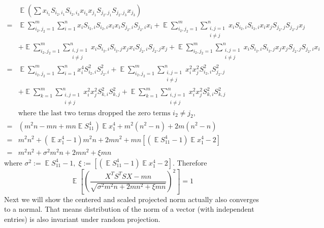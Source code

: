 \documentclass[12pt]{extarticle}
\newcommand{\1}{\field{1}}
\DeclareMathOperator{\E}{\mathbb{E}}
\numberwithin{equation}{section}
\begin{document}
\begin{align*}
& \E \left( \sum x_{i_1} S_{i_2,i_1} S_{i_2,i_3} x_{i_3} x_{j_1} S_{j_2,j_1} S_{j_2,j_3} x_{j_3} \right)  \\
= & \E \sum_{i_2, j_2=1}^m \sum_{i=1}^n x_i S_{i_2,i} S_{i_2,i} x_{i} x_{i} S_{j_2,i} S_{j_2,i} x_{i}  
+  \E  \sum_{i_2, j_2=1}^m \sum_{\substack{i,j=1\\ i\ne j}}^n x_{i} S_{i_2,i} S_{i_2,i} x_{i} x_{j} S_{j_2,j} S_{j_2,j} x_{j}   \\
& + \E  \sum_{i_2, j_2=1}^m \sum_{\substack{i,j=1\\ i\ne j}}^n x_{i} S_{i_2,i} S_{i_2,j} x_{j} x_{i} S_{j_2,i} S_{j_2,j} x_{j}  
 + \E  \sum_{i_2, j_2=1}^m \sum_{\substack{i,j=1\\ i\ne j}}^n x_{i} S_{i_2,i} S_{i_2,j} x_{j} x_{j} S_{j_2,j} S_{j_2,i} x_{i} \\
= & \E \sum_{i_2, j_2=1}^m \sum_{i=1}^n x_i^4 S_{i_2,i}^2  S_{j_2,i}^2   
+ \E  \sum_{i_2, j_2=1}^m \sum_{\substack{i,j=1\\ i\ne j}}^n x_{i}^2 x_{j}^2 S_{i_2,i}^2 S_{j_2,j}^2 \\
& + \E  \sum_{k=1}^m \sum_{\substack{i,j=1\\ i\ne j}}^n x_{i}^2 x_{j}^2 S_{k,i}^2 S_{k,j}^2   
+ \E  \sum_{k=1}^m \sum_{\substack{i,j=1\\ i\ne j}}^n x_{i}^2 x_{j}^2  S_{k,i}^2 S_{k,j}^2  \\
& \text{where the last two terms dropped the zero terms $i_2\ne j_2$, } \\
= & (m^2n-mn+mn\E S_{11}^4)\E x_1^4 + m^2(n^2-n) + 2m(n^2-n) \\
= & m^2n^2 + (\E x_1^4-1) m^2n + 2mn^2 + mn[(\E S_{11}^4-1)\E x_1^4 -2] \\
= & m^2n^2 + \sigma^2 m^2n + 2mn^2 + \xi mn
\end{align*}
where $\sigma^2:= \E S_{11}^4-1, \; \xi:=[(\E S_{11}^4-1)\E x_1^4 -2]$. Therefore 
\begin{equation}\label{eqn: projected norm variance}
    \E \left[\left( \frac{X^TS^TSX - mn}{\sqrt{\sigma^2 m^2n+2mn^2+\xi mn}} \right)^2 \right] 
    =   1 
\end{equation}
Next we will show the centered and scaled projected norm actually also converges to a normal. That means distribution of the norm of a  vector (with independent entries) is also invariant under random projection.
\end{document}
